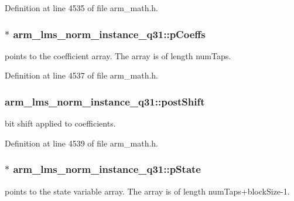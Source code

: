 Definition at line 4535 of file arm\-\_\-math.\-h.

\hypertarget{structarm__lms__norm__instance__q31_a57a64c1ff102d033c1bd05043f1d9955}{
\subsubsection[{p\-Coeffs}]{$\ast$ arm\-\_\-lms\-\_\-norm\-\_\-instance\-\_\-q31\-::p\-Coeffs}}\label{structarm__lms__norm__instance__q31_a57a64c1ff102d033c1bd05043f1d9955}
points to the coefficient array. The array is of length num\-Taps. 

Definition at line 4537 of file arm\-\_\-math.\-h.

\hypertarget{structarm__lms__norm__instance__q31_a28d7b9e437817f83397e081967e90f3c}{
\subsubsection[{post\-Shift}]{ arm\-\_\-lms\-\_\-norm\-\_\-instance\-\_\-q31\-::post\-Shift}}\label{structarm__lms__norm__instance__q31_a28d7b9e437817f83397e081967e90f3c}
bit shift applied to coefficients. 

Definition at line 4539 of file arm\-\_\-math.\-h.

\hypertarget{structarm__lms__norm__instance__q31_a6b25c96cf048b77078d62f4252a01ec4}{
\subsubsection[{p\-State}]{$\ast$ arm\-\_\-lms\-\_\-norm\-\_\-instance\-\_\-q31\-::p\-State}}\label{structarm__lms__norm__instance__q31_a6b25c96cf048b77078d62f4252a01ec4}
points to the state variable array. The array is of length num\-Taps+block\-Size-\/1. 

